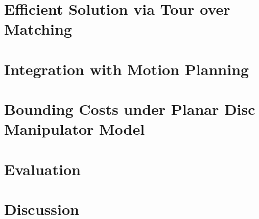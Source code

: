 \documentclass{llncs}
\begin{document}
\vspace{-.15in}
\section{Efficient Solution via Tour over Matching}
\label{sec:approximation}
\vspace{-.1in}


\vspace{-.15in}
\section{Integration with Motion Planning}
\label{sec:integration}
\vspace{-.1in}


\vspace{-.15in}
\section{Bounding Costs under Planar Disc Manipulator Model}
\label{sec:cost_bounds}
\vspace{-.1in}


\vspace{-.15in}
\section{Evaluation}
\label{sec:evaluation}
\vspace{-.1in}


\vspace{-.15in}
\section{Discussion}
\label{sec:discussion}
\vspace{-.1in}


%
{\small

}


%
\end{document}
